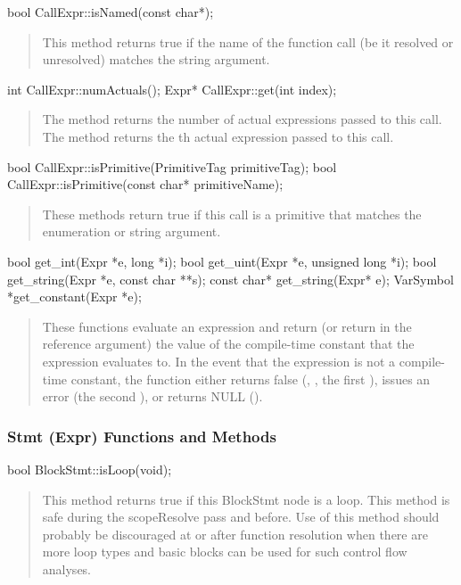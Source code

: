 \documentclass[10pt]{article}
\begin{document}
\begin{clang}
bool CallExpr::isNamed(const char*);
\end{clang}
\begin{quote}
This method returns true if the name of the function call (be it
resolved or unresolved) matches the string argument.
\end{quote}

\begin{clang}
int CallExpr::numActuals();
Expr* CallExpr::get(int index);
\end{clang}
\begin{quote}
The method  returns the number of actual expressions
passed to this call.  The method  returns the th
actual expression passed to this call.
\end{quote}

\begin{clang}
bool CallExpr::isPrimitive(PrimitiveTag primitiveTag);
bool CallExpr::isPrimitive(const char* primitiveName);
\end{clang}
\begin{quote}
These methods return true if this call is a primitive that matches the
enumeration or string argument.
\end{quote}

\begin{clang}
bool get_int(Expr *e, long *i);
bool get_uint(Expr *e, unsigned long *i);
bool get_string(Expr *e, const char **s);
const char* get_string(Expr* e);
VarSymbol *get_constant(Expr *e);
\end{clang}
\begin{quote}
These functions evaluate an expression and return (or return in the
reference argument) the value of the compile-time constant that the
expression evaluates to.  In the event that the expression is not a
compile-time constant, the function either returns false
(, , the first ), issues an
error (the second ), or returns NULL
().
\end{quote}

\subsubsection{Stmt (Expr) Functions and Methods}

\begin{clang}
bool BlockStmt::isLoop(void);
\end{clang}
\begin{quote}
This method returns true if this BlockStmt node is a loop.  This
method is safe during the scopeResolve pass and before.  Use of this
method should probably be discouraged at or after function resolution
when there are more loop types and basic blocks can be used for such
control flow analyses.
\end{quote}
\end{document}
